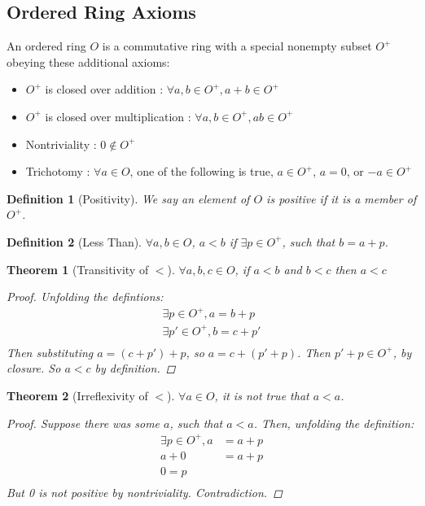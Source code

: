 \documentclass{article}
\newtheorem{thm}{Theorem}
\newtheorem*{defun}{Definition}
\begin{document}
  \subsection{Ordered Ring Axioms}
  An ordered ring $O$ is a commutative ring with a special nonempty subset $O^+$ obeying these additional axioms:
  \begin{itemize}
  \item $O^+$ is closed over addition : $\forall a, b \in O^+, a + b \in O^+$
  \item $O^+$ is closed over multiplication : $\forall a, b \in O^+, ab \in O^+$
  \item Nontriviality : $0 \notin O^+$
  \item Trichotomy :  $\forall a \in O$, one of the following is true, $a \in O^+$, $a = 0$, or $-a \in O^+$
  \end{itemize}
  \begin{defun}[Positivity] We say an element of $O$ is positive if it is a member of $O^+$.\end{defun}
  \begin{defun}[Less Than] $\forall a, b \in O$, $a < b$ if $\exists p \in O^+$, such that $b = a + p$.\end{defun}
  \begin{thm}[Transitivity of $<$]\label{ltt} $\forall a, b, c \in O$, if $a < b$ and $b < c$ then $a < c$
    \begin{proof}
      Unfolding the defintions:
      \begin{align*}
        \exists p \in O^+, a = b + p \\
        \exists p'\in O^+, b = c + p'\\
      \end{align*}
      Then substituting $a = (c + p') + p$, so $a = c + (p' + p)$. Then $p' + p \in O^+$, by closure. So $a < c$ by definition.
    \end{proof}
  \end{thm}
  \begin{thm} [Irreflexivity of $<$]\label{ltirrefl} $\forall a \in O$, it is not true that $a < a$.
    \begin{proof}
      Suppose there was some $a$, such that $a < a$. Then, unfolding the definition:
      \begin{align*}
        \exists p \in O^+, a &= a + p\\
        a + 0 &= a + p\\
        0 = p\\
      \end{align*}
      But 0 is not positive by nontriviality. Contradiction.
    \end{proof}
  \end{thm}
\end{document}
